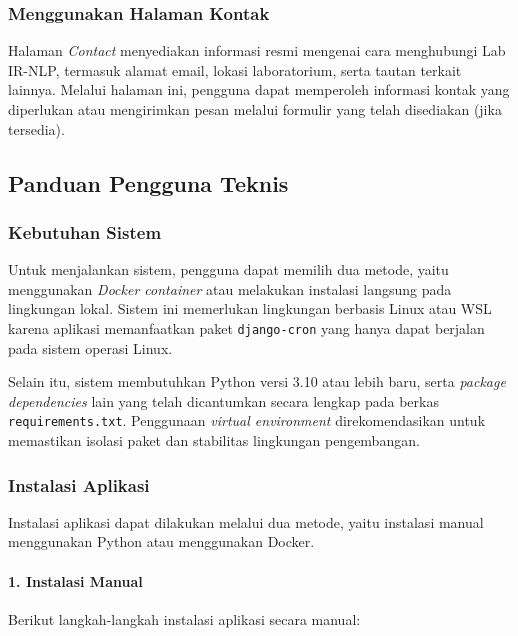 \subsubsection{Menggunakan Halaman Kontak}
Halaman \textit{Contact} menyediakan informasi resmi mengenai cara menghubungi Lab IR-NLP, termasuk alamat email, lokasi laboratorium, serta tautan terkait lainnya. Melalui halaman ini, pengguna dapat memperoleh informasi kontak yang diperlukan atau mengirimkan pesan melalui formulir yang telah disediakan (jika tersedia).

\subsection{Panduan Pengguna Teknis}
\subsubsection{Kebutuhan Sistem}
Untuk menjalankan sistem, pengguna dapat memilih dua metode, yaitu menggunakan \textit{Docker container} atau melakukan instalasi langsung pada lingkungan lokal. Sistem ini memerlukan lingkungan berbasis Linux atau WSL karena aplikasi memanfaatkan paket \texttt{django-cron} yang hanya dapat berjalan pada sistem operasi Linux.

Selain itu, sistem membutuhkan Python versi 3.10 atau lebih baru, serta \textit{package dependencies} lain yang telah dicantumkan secara lengkap pada berkas \texttt{requirements.txt}. Penggunaan \textit{virtual environment} direkomendasikan untuk memastikan isolasi paket dan stabilitas lingkungan pengembangan.

\subsubsection{Instalasi Aplikasi}
Instalasi aplikasi dapat dilakukan melalui dua metode, yaitu instalasi manual menggunakan Python atau menggunakan Docker.

\paragraph{1. Instalasi Manual}
Berikut langkah-langkah instalasi aplikasi secara manual:

